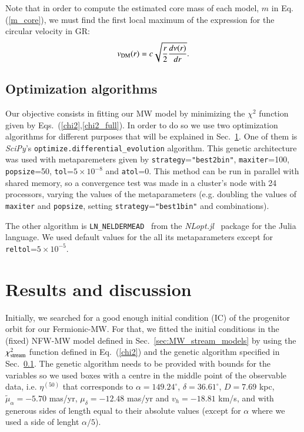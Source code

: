 \documentclass[twocolumn]{aa}
\begin{document}
Note that in order to compute the estimated core mass of each model, $m$ in Eq.(\ref{m_core}),
we must find the first local maximum of the expression for the circular velocity in GR:
\begin{equation}
   \label{v_circ_dm}
   v_{\rm{DM}}(r)= c\sqrt{\frac{r}{2}\frac{d\nu(r)}{dr}}.
\end{equation}

\subsection{Optimization algorithms}
\label{sec:optimization}

Our objective consists in fitting our MW model by minimizing the $\chi^2$ function given by Eqs.~(\ref{chi2},\ref{chi2_full}).  In order to do so we use two optimization algorithms for different purposes
that will be explained in Sec.~\ref{sec:results}.
One of them is {\it SciPy}'s
\texttt{optimize.differential\_evolution} algorithm. This genetic architecture
was used with metaparemeters given by
\texttt{strategy}=\texttt{"best2bin"}, \texttt{maxiter}=100, \texttt{popsize}=50,
\texttt{tol}=$5\times10^{-8}$ and \texttt{atol}=0. This method can be run in parallel with shared memory,
so a convergence test was made in a cluster's node with 24 processors, varying the values of the metaparameters (e.g. doubling the values of \texttt{maxiter} and \texttt{popsize}, setting \texttt{strategy}=\texttt{"best1bin"} and combinations).

The other algorithm is \texttt{LN\_NELDERMEAD}~\citep{NELDERMEAD,10.1093/comjnl/8.1.42,shere} from the
{\it NLopt.jl}~\citep{NLopt} package
for the {\sc Julia}~\citep{bezanson2017julia} language.
We used default values for the all its metaparameters except for
\texttt{reltol}=$5\times10^{-5}$.



\section{Results and discussion}
\label{sec:results}

Initially, we searched for a good enough initial condition (IC) of the progenitor orbit for our
Fermionic-MW. For that, we fitted the initial conditions in the (fixed) NFW-MW model defined in
Sec.~\ref{sec:MW_stream_models} by using the $\chi^2_{\rm{stream}}$ function defined in Eq.~(\ref{chi2})
and the genetic algorithm specified in Sec.~\ref{sec:optimization}. The genetic algorithm
needs to be provided with bounds for the variables so we used boxes with a centre in the middle point
of the observable data, i.e. $\eta^{(50)}$ that corresponds to $\alpha=149.24^{\circ}$, $\delta=36.61^{\circ}$, $D=7.69$ kpc, $\tilde{\mu}_\alpha=-5.70$ mas/yr, $\mu_\delta=-12.48$ mas/yr and $v_h=-18.81$ km/s, and with generous sides of length equal to their absolute values (except for $\alpha$ where we used a side of lenght $\alpha/5$).
\end{document}
